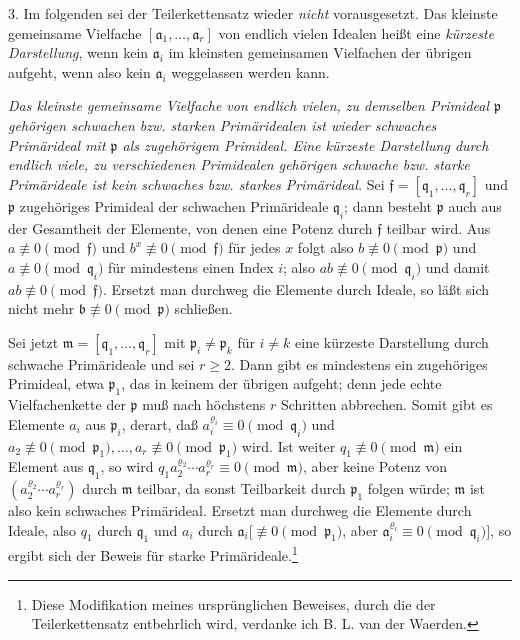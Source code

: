 \documentclass[11pt]{article}
\providecommand{\ma}{\mathfrak{a}}
\providecommand{\mb}{\mathfrak{b}}
\providecommand{\mf}{\mathfrak{f}}
\providecommand{\mm}{\mathfrak{m}}
\providecommand{\mpideal}{\mathfrak{p}}
\providecommand{\mq}{\mathfrak{q}}
\begin{document}
3. Im folgenden sei der Teilerkettensatz wieder \emph{nicht} vorausgesetzt. Das kleinste gemeinsame Vielfache $[\ma_1,\ldots,\ma_r]$ von endlich vielen Idealen heißt eine \emph{kürzeste Darstellung}, wenn kein $\ma_i$ im kleinsten gemeinsamen Vielfachen der übrigen aufgeht, wenn also kein $\ma_i$ weggelassen werden kann.

\emph{Das kleinste gemeinsame Vielfache von endlich vielen, zu demselben Primideal $\mpideal$ gehörigen schwachen bzw. starken Primäridealen ist wieder schwaches Primärideal mit $\mpideal$ als zugehörigem Primideal. Eine kürzeste Darstellung durch endlich viele, zu verschiedenen Primidealen gehörigen schwache bzw. starke Primärideale ist kein schwaches bzw. starkes Primärideal.} Sei $\mf=[\mq_1,\ldots,\mq_r]$ und $\mpideal$ zugehöriges Primideal der schwachen Primärideale $\mq_i$; dann besteht $\mpideal$ auch aus der Gesamtheit der Elemente, von denen eine Potenz durch $\mf$ teilbar wird. Aus $a\not\equiv0\pmod{\mf}$ und $b^x\not\equiv0\pmod{\mf}$ für jedes $x$ folgt also $b\not\equiv0\pmod{\mpideal}$ und $a\not\equiv0\pmod{\mq_i}$ für mindestens einen Index $i$; also $ab\not\equiv0\pmod{\mq_i}$ und damit $ab\not\equiv0\pmod{\mf}$. Ersetzt man durchweg die Elemente durch Ideale, so läßt sich nicht mehr $\mb\not\equiv0\pmod{\mpideal}$ schließen.

Sei jetzt $\mm=[\mq_1,
\ldots,\mq_r]$ mit $\mpideal_i\ne\mpideal_k$ für $i\ne k$ eine kürzeste Darstellung durch schwache Primärideale und sei $r\ge2$. Dann gibt es mindestens ein zugehöriges Primideal, etwa $\mpideal_1$, das in keinem der übrigen aufgeht; denn jede echte Vielfachenkette der $\mpideal$ muß nach höchstens $r$ Schritten abbrechen. Somit gibt es Elemente $a_i$ aus $\mpideal_i$, derart, daß $a_i^{\varrho_i}\equiv0\pmod{\mq_i}$ und $a_2\not\equiv0\pmod{\mpideal_1},\ldots,a_r\not\equiv0\pmod{\mpideal_1}$ wird. Ist weiter $q_1\not\equiv0\pmod{\mm}$ ein Element aus $\mq_1$, so wird $q_1 a_2^{\varrho_2}\cdots a_r^{\varrho_r}\equiv0\pmod{\mm}$, aber keine Potenz von $(a_2^{\varrho_2}\cdots a_r^{\varrho_r})$ durch $\mm$ teilbar, da sonst Teilbarkeit durch $\mpideal_1$ folgen würde; $\mm$ ist also kein schwaches Primärideal. Ersetzt man durchweg die Elemente durch Ideale, also $q_1$ durch $\mq_1$ und $a_i$ durch $\ma_i[\not\equiv0\pmod{\mpideal_1}$, aber $\ma_i^{\varrho_i}\equiv0\pmod{\mq_i}]$, so ergibt sich der Beweis für starke Primärideale.\footnote{Diese Modifikation meines ursprünglichen Beweises, durch die der Teilerkettensatz entbehrlich wird, verdanke ich B. L. van der Waerden.}
\end{document}
